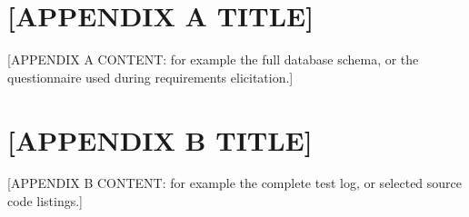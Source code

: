%
%      
%
%
\appendix

\chapter{[APPENDIX A TITLE]}
\label{app:a}

[APPENDIX A CONTENT: for example the full database schema, or the
questionnaire used during requirements elicitation.]

\chapter{[APPENDIX B TITLE]}
\label{app:b}

[APPENDIX B CONTENT: for example the complete test log, or selected
source code listings.]
